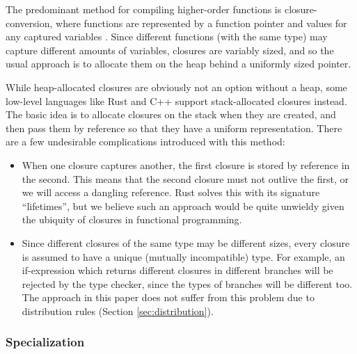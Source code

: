 \documentclass[runningheads]{llncs}
\begin{document}
The predominant method for compiling higher-order functions is closure-conversion, where functions are represented by a function pointer and values for any captured variables \cite{minamide1996typed}. Since different functions (with the same type) may capture different amounts of variables, closures are variably sized, and so the usual approach is to allocate them on the heap behind a uniformly sized pointer.

While heap-allocated closures are obviously not an option without a heap, some low-level languages like Rust and C++ support stack-allocated closures instead. The basic idea is to allocate closures on the stack when they are created, and then pass them by reference so that they have a uniform representation. There are a few undesirable complications introduced with this method:

\begin{itemize}
  \item When one closure captures another, the first closure is stored by reference in the second. This means that the second closure must not outlive the first, or we will access a dangling reference. Rust solves this with its signature ``lifetimes'', but we believe such an approach would be quite unwieldy given the ubiquity of closures in functional programming.
  \item Since different closures of the same type may be different sizes, every closure is assumed to have a unique (mutually incompatible) type. For example, an if-expression which returns different closures in different branches will be rejected by the type checker, since the types of branches will be different too. The approach in this paper does not suffer from this problem due to distribution rules (Section \ref{sec:distribution}).
\end{itemize}



\subsubsection{Specialization} \label{sec:specialization}
\end{document}
